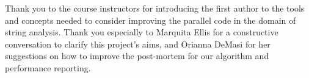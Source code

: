 \documentclass[10pt]{article}
\begin{document}
Thank you to the course instructors for introducing the first author to the tools and concepts
needed to consider improving the parallel code in the domain of string analysis.
Thank you especially to Marquita Ellis for a constructive conversation to clarify
this project's aims, and Orianna DeMasi for her suggestions on how to improve the post-mortem
for our algorithm and performance reporting.

\printbibliography{}
\end{document}
